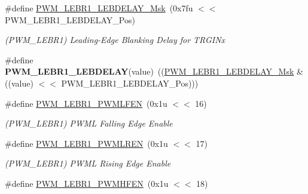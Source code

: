 \begin{DoxyCompactItemize}
\item 
\mbox{\label{group__SAMS70__PWM_ga80e118631de809b0488bbfbcc5c1ade2}} 
\#define \mbox{\hyperlink{group__SAMS70__PWM_ga80e118631de809b0488bbfbcc5c1ade2}{P\+W\+M\+\_\+\+L\+E\+B\+R1\+\_\+\+L\+E\+B\+D\+E\+L\+A\+Y\+\_\+\+Msk}}~(0x7fu $<$$<$ P\+W\+M\+\_\+\+L\+E\+B\+R1\+\_\+\+L\+E\+B\+D\+E\+L\+A\+Y\+\_\+\+Pos)
\begin{DoxyCompactList}\small\item\em (P\+W\+M\+\_\+\+L\+E\+B\+R1) Leading-\/\+Edge Blanking Delay for T\+R\+G\+I\+Nx \end{DoxyCompactList}\item 
\mbox{\label{group__SAMS70__PWM_ga891308bf34bdc2cf6054a01820a4e32e}} 
\#define {\bfseries P\+W\+M\+\_\+\+L\+E\+B\+R1\+\_\+\+L\+E\+B\+D\+E\+L\+AY}(value)~((\mbox{\hyperlink{group__SAMV71__PWM_ga80e118631de809b0488bbfbcc5c1ade2}{P\+W\+M\+\_\+\+L\+E\+B\+R1\+\_\+\+L\+E\+B\+D\+E\+L\+A\+Y\+\_\+\+Msk}} \& ((value) $<$$<$ P\+W\+M\+\_\+\+L\+E\+B\+R1\+\_\+\+L\+E\+B\+D\+E\+L\+A\+Y\+\_\+\+Pos)))
\item 
\mbox{\label{group__SAMS70__PWM_ga0c148eb9b70c985a577669a6115a7731}} 
\#define \mbox{\hyperlink{group__SAMS70__PWM_ga0c148eb9b70c985a577669a6115a7731}{P\+W\+M\+\_\+\+L\+E\+B\+R1\+\_\+\+P\+W\+M\+L\+F\+EN}}~(0x1u $<$$<$ 16)
\begin{DoxyCompactList}\small\item\em (P\+W\+M\+\_\+\+L\+E\+B\+R1) P\+W\+ML Falling Edge Enable \end{DoxyCompactList}\item 
\mbox{\label{group__SAMS70__PWM_ga21c0d10aa0794ea08fa5a4137d9648a3}} 
\#define \mbox{\hyperlink{group__SAMS70__PWM_ga21c0d10aa0794ea08fa5a4137d9648a3}{P\+W\+M\+\_\+\+L\+E\+B\+R1\+\_\+\+P\+W\+M\+L\+R\+EN}}~(0x1u $<$$<$ 17)
\begin{DoxyCompactList}\small\item\em (P\+W\+M\+\_\+\+L\+E\+B\+R1) P\+W\+ML Rising Edge Enable \end{DoxyCompactList}\item 
\mbox{\label{group__SAMS70__PWM_ga3097a80df30369f61b77e3759b2fb168}} 
\#define \mbox{\hyperlink{group__SAMS70__PWM_ga3097a80df30369f61b77e3759b2fb168}{P\+W\+M\+\_\+\+L\+E\+B\+R1\+\_\+\+P\+W\+M\+H\+F\+EN}}~(0x1u $<$$<$ 18)
$$
\end{DoxyCompactItemize}
